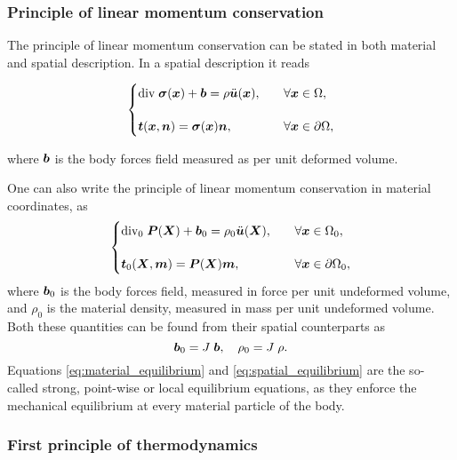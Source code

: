 \subsubsection{Principle of linear momentum conservation}

The principle of linear momentum conservation can be stated in both material and spatial description.
In a spatial description it reads
\begin{highlight}
    \begin{equation}
        \begin{cases}
            \text{div}\;\bm{\sigma}(\bm{x}) + \bm{b} = \rho \ddot{\bm{u}}(\bm{x}),&\quad \forall\bm{x}\in \Omega,\\[12pt]
            \bm{t}(\bm{x},\bm{n}) = \bm{\sigma}(\bm{x}) \bm{n},&\quad \forall\bm{x}\in\partial\Omega,
        \end{cases} \label{eq:material_equilibrium}
    \end{equation}
\end{highlight}
where $\bm{b}$ is the body forces field measured as per unit deformed volume.

One can also write the principle of linear momentum conservation in material coordinates, as
\begin{equation}
    \begin{cases}
        \text{div}_0\;\bm{P}(\bm{X}) + \bm{b}_0 = \rho_0 \ddot{\bm{u}}(\bm{X}),&\quad\forall \bm{x}\in \Omega_0,\\[12pt]
        \bm{t}_0(\bm{X},\bm{m}) = \bm{P}(\bm{X}) \bm{m},&\quad \forall\bm{x}\in\partial\Omega_0,
    \end{cases}\label{eq:spatial_equilibrium}
\end{equation}
where $\bm{b}_0$ is the body forces field, measured in force per unit undeformed volume, and $\rho_0$ is the material density, measured in mass per unit undeformed volume. Both these quantities can be found from their spatial counterparts as
\begin{equation}
    \bm{b}_0 = J\;\bm{b},\quad \rho_0 = J\;\rho.
\end{equation}
Equations \eqref{eq:material_equilibrium} and \eqref{eq:spatial_equilibrium} are the so-called strong, point-wise or local equilibrium equations, as they enforce the mechanical equilibrium at every material particle of the body.

\subsubsection{First principle of thermodynamics}

